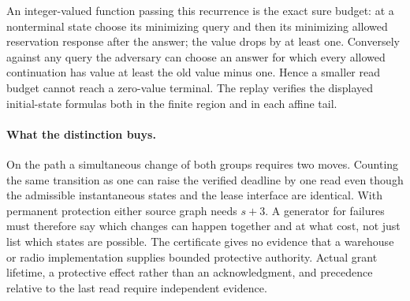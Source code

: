 \documentclass[11pt]{article}
\begin{document}
An integer-valued function passing this recurrence is the exact sure budget: at a nonterminal state choose its minimizing query and then its minimizing allowed reservation response after the answer; the value drops by at least one. Conversely against any query the adversary can choose an answer for which every allowed continuation has value at least the old value minus one. Hence a smaller read budget cannot reach a zero-value terminal. The replay verifies the displayed initial-state formulas both in the finite region and in each affine tail.

\paragraph{What the distinction buys.}
On the path a simultaneous change of both groups requires two moves. Counting the same transition as one can raise the verified deadline by one read even though the admissible instantaneous states and the lease interface are identical. With permanent protection either source graph needs $s+3$. A generator for failures must therefore say which changes can happen together and at what cost, not just list which states are possible. The certificate gives no evidence that a warehouse or radio implementation supplies bounded protective authority. Actual grant lifetime, a protective effect rather than an acknowledgment, and precedence relative to the last read require independent evidence.
\end{document}
